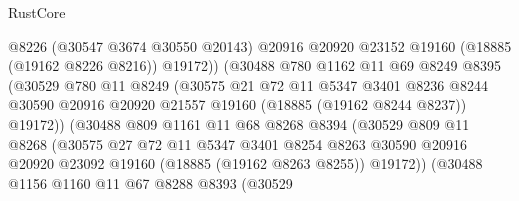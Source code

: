 \begin{lexlean}{RustCore}
\begin{coremodule}
                              @8226
                              (@30547 @3674 @30550 @20143)
                              @20916
                              @20920
                              @23152
                              @19160
                              (@18885 (@19162 @8226 @8216))
                              @19172))
                          (@30488
                            @780
                            @1162
                            @11
                            @69
                            @8249
                            @8395
                            (@30529
                              @780
                              @11
                              @8249
                              (@30575
                                @21
                                @72
                                @11
                                @5347
                                @3401
                                @8236
                                @8244
                                @30590
                                @20916
                                @20920
                                @21557
                                @19160
                                (@18885 (@19162 @8244 @8237))
                                @19172))
                            (@30488
                              @809
                              @1161
                              @11
                              @68
                              @8268
                              @8394
                              (@30529
                                @809
                                @11
                                @8268
                                (@30575
                                  @27
                                  @72
                                  @11
                                  @5347
                                  @3401
                                  @8254
                                  @8263
                                  @30590
                                  @20916
                                  @20920
                                  @23092
                                  @19160
                                  (@18885 (@19162 @8263 @8255))
                                  @19172))
                              (@30488
                                @1156
                                @1160
                                @11
                                @67
                                @8288
                                @8393
                                (@30529

\end{coremodule}
\end{lexlean}
